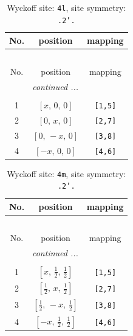 \documentclass[fleqn,8pt]{jsarticle}
\begin{document}
\renewcommand{\arraystretch}{1.2}
\begin{longtable}{ccc}
\caption{Wyckoff site: {\tt 4l}, site symmetry: {\tt .2'.}}
 \\
 \hline \hline
No. & position & mapping \\ \hline \endfirsthead

\multicolumn{2}{l}{\tablename\ \thetable{}} \\
 \hline \hline
No. & position & mapping \\ \hline \endhead

 \hline \hline
\multicolumn{2}{r}{\footnotesize\it continued ...} \\ \endfoot

 \hline \hline
\multicolumn{2}{r}{} \\ \endlastfoot

1 & $\left[ x,\, 0,\, 0 \right]$ & {\tt [1,5]} \\ \hline
2 & $\left[ 0,\, x,\, 0 \right]$ & {\tt [2,7]} \\ \hline
3 & $\left[ 0,\, - x,\, 0 \right]$ & {\tt [3,8]} \\ \hline
4 & $\left[ - x,\, 0,\, 0 \right]$ & {\tt [4,6]} \\
\end{longtable}
\renewcommand{\arraystretch}{1.2}
\begin{longtable}{ccc}
\caption{Wyckoff site: {\tt 4m}, site symmetry: {\tt .2'.}}
 \\
 \hline \hline
No. & position & mapping \\ \hline \endfirsthead

\multicolumn{2}{l}{\tablename\ \thetable{}} \\
 \hline \hline
No. & position & mapping \\ \hline \endhead

 \hline \hline
\multicolumn{2}{r}{\footnotesize\it continued ...} \\ \endfoot

 \hline \hline
\multicolumn{2}{r}{} \\ \endlastfoot

1 & $\left[ x,\, \frac{1}{2},\, \frac{1}{2} \right]$ & {\tt [1,5]} \\ \hline
2 & $\left[ \frac{1}{2},\, x,\, \frac{1}{2} \right]$ & {\tt [2,7]} \\ \hline
3 & $\left[ \frac{1}{2},\, - x,\, \frac{1}{2} \right]$ & {\tt [3,8]} \\ \hline
4 & $\left[ - x,\, \frac{1}{2},\, \frac{1}{2} \right]$ & {\tt [4,6]} \\
\end{longtable}
\end{document}
